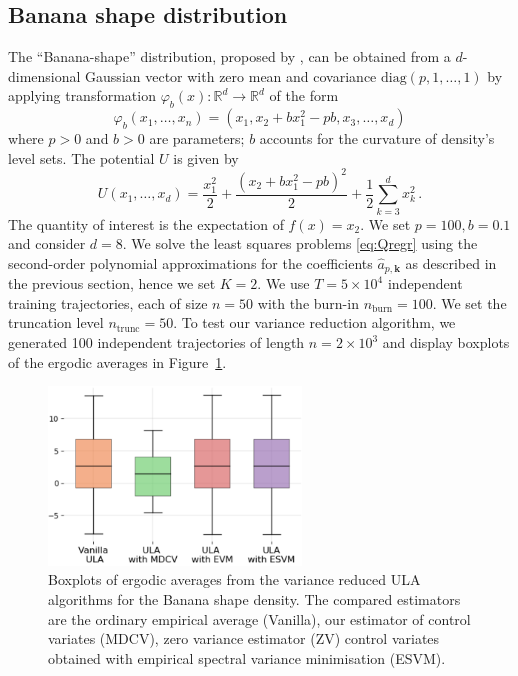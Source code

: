 \documentclass[bj]{imsart}
\def\rset{\mathbb{R}}
\def\rset{\mathbb{R}}
\def\eqsp{\,}
\begin{document}
\subsection{Banana shape distribution}
The “Banana-shape” distribution, proposed by \cite{haario1999adaptive}, can be obtained from a $d$-dimensional Gaussian vector with zero mean and covariance $\mathrm{diag}(p,1,\ldots,1)$ by applying transformation $\varphi_b(x) : \rset^d \rightarrow \rset^d$ of the form
\[
\varphi_b(x_1,\ldots,x_n) = (x_1, x_2 + bx^2_1 - pb,x_3,\ldots,x_d)
\]
where $p > 0$ and $b > 0$ are parameters; $b$ accounts for the curvature of density’s level sets. The potential $U$ is given by
\[
U(x_1,\ldots, x_d) = \frac{x_1^2}{2} + \frac{(x_2 + bx_1^2 - pb)^2}{2} + \frac{1}{2} \sum_{k=3}^{d} x_k^2 \eqsp.
\]
The quantity of interest is the expectation of $f(x) = x_2$. We set $p = 100, b = 0.1$ and consider $d=8$. We solve the least squares  problems \eqref{eq:Qregr} using the second-order polynomial approximations for the coefficients \(\hat{a}_{p,\mathbf{k}}\) as described in the previous section, hence we set $K = 2$. We use $T= 5 \times 10^4$ independent training trajectories, each of size $n=50$ with the burn-in $n_{\text{burn}} = 100$. We set the truncation level \(n_{\mathrm{trunc}} = 50\). To test our variance reduction algorithm, we generated 100 independent trajectories of length $n = 2 \times 10^3$ and display boxplots of the ergodic averages in Figure~\ref{fig:banana_shape}.

\begin{figure}[h]
\begin{center}
\includegraphics[width=0.6\textwidth]{../pictures/banana_shape.png}
\caption{Boxplots of ergodic averages  from the variance reduced ULA algorithms for the Banana shape density. The compared estimators are the ordinary empirical average (Vanilla), our estimator of control variates (MDCV), zero variance estimator (ZV) control variates obtained with empirical spectral variance minimisation (ESVM).
\label{fig:banana_shape}}
\end{center}
\end{figure}
\end{document}
